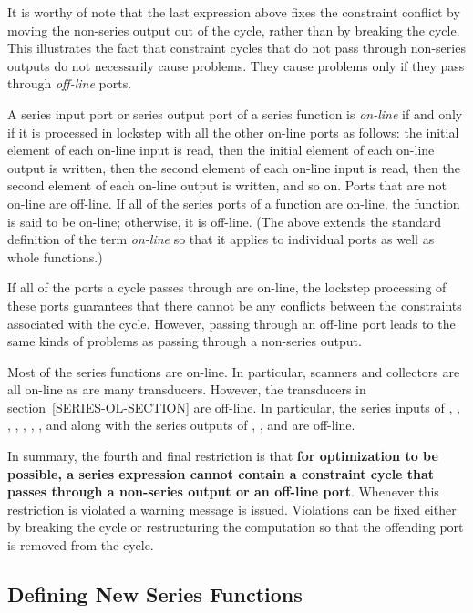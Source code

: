 It is worthy of note that the last expression above fixes the constraint
conflict by moving the non-series output out of the cycle, rather than by
breaking the cycle.  This illustrates the fact that constraint cycles that
do not pass through non-series outputs do not necessarily cause problems.
They cause problems only if they pass through {\it off-line} ports.

A series input port or series output port of a series function is {\it on-line}
if and only if it is processed in lockstep with all the other on-line
ports as follows:  the initial element of each on-line input is
read, then the initial element of each on-line output is written, then the
second element of each on-line input is read, then the second element of
each on-line output is written, and so on.  Ports that are not on-line are
off-line.  If all of the series ports of a function are on-line, the
function is said to be on-line; otherwise, it is off-line.  (The above
extends the standard definition of the term {\it on-line} so that it applies
to individual ports as well as whole functions.)

If all of the ports a cycle passes through are on-line, the lockstep
processing of these ports guarantees that there cannot be any conflicts
between the constraints associated with the cycle.  However, passing
through an off-line port leads to the same kinds of problems as passing
through a non-series output.

Most of the series functions are on-line.  In particular, scanners and
collectors are all on-line as are many transducers.  However, the
transducers in section~\ref{SERIES-OL-SECTION} are off-line.  In particular, the
series inputs of , , , , ,
, , and  along with the
series outputs of , , and  are off-line.

In summary, the fourth and final restriction is that {\bf for optimization
to be possible, a series expression cannot contain a constraint cycle that
passes through a non-series output or an off-line port}.  Whenever this
restriction is violated a warning message is issued.  Violations can be
fixed either by breaking the cycle or restructuring the computation so that
the offending port is removed from the cycle.

\subsection{Defining New Series Functions}

